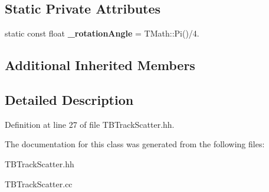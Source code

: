 \subsection*{Static Private Attributes}
\begin{DoxyCompactItemize}
\item 
static const float {\bfseries \-\_\-rotation\-Angle} = T\-Math\-::\-Pi()/4.\label{classTBTrackScatter_afc07015eaaeb5336f43d061ab54dfc67}

\end{DoxyCompactItemize}
\subsection*{Additional Inherited Members}


\subsection{Detailed Description}


Definition at line 27 of file T\-B\-Track\-Scatter.\-hh.



The documentation for this class was generated from the following files\-:\begin{DoxyCompactItemize}
\item 
T\-B\-Track\-Scatter.\-hh\item 
T\-B\-Track\-Scatter.\-cc\end{DoxyCompactItemize}
